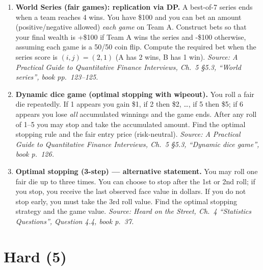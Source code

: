 \documentclass[11pt]{article}
\begin{document}
\begin{enumerate}[leftmargin=*, itemsep=0.9em]
\item \textbf{World Series (fair games): replication via DP.}  
A best-of-7 series ends when a team reaches 4 wins. You have \$100 and you can bet an amount (positive/negative allowed) \emph{each game} on Team A. Construct bets so that your final wealth is +\$100 if Team A wins the series and -\$100 otherwise, assuming each game is a 50/50 coin flip. Compute the required bet when the series score is $(i,j)=(2,1)$ (A has 2 wins, B has 1 win).  
\textit{Source: A Practical Guide to Quantitative Finance Interviews, Ch.\ 5 \S5.3, ``World series'', book pp.\ 123--125.}

\item \textbf{Dynamic dice game (optimal stopping with wipeout).}  
You roll a fair die repeatedly. If 1 appears you gain \$1, if 2 then \$2, \dots, if 5 then \$5; if 6 appears you lose \emph{all} accumulated winnings and the game ends. After any roll of 1--5 you may stop and take the accumulated amount. Find the optimal stopping rule and the fair entry price (risk-neutral).  
\textit{Source: A Practical Guide to Quantitative Finance Interviews, Ch.\ 5 \S5.3, ``Dynamic dice game'', book p.\ 126.}

\item \textbf{Optimal stopping (3-step) --- alternative statement.}  
You may roll one fair die up to three times. You can choose to stop after the 1st or 2nd roll; if you stop, you receive the last observed face value in dollars. If you do not stop early, you must take the 3rd roll value. Find the optimal stopping strategy and the game value.  
\textit{Source: Heard on the Street, Ch.\ 4 ``Statistics Questions'', Question 4.4, book p.\ 37.}

\end{enumerate}

\section*{Hard (5)}
\end{document}
